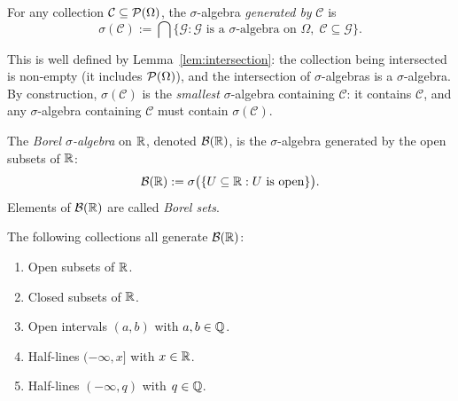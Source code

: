 \documentclass[11pt,a4paper]{article}
\begin{document}
\begin{definition}
\label{def:generated}
For any collection $\mathcal{C} \subseteq \mathcal{P}(\Omega)$, the
$\sigma$-algebra \emph{generated by} $\mathcal{C}$ is
\begin{equation}
  \sigma(\mathcal{C}) := \bigcap\bigl\{\mathcal{G} :
    \mathcal{G} \text{ is a $\sigma$-algebra on } \Omega,\;
    \mathcal{C} \subseteq \mathcal{G}\bigr\}.
  \label{eq:generated}
\end{equation}
\end{definition}

\begin{remark}
This is well defined by Lemma~\ref{lem:intersection}: the collection
being intersected is non-empty (it includes $\mathcal{P}(\Omega)$), and the
intersection of $\sigma$-algebras is a $\sigma$-algebra. By construction,
$\sigma(\mathcal{C})$ is the \emph{smallest} $\sigma$-algebra containing
$\mathcal{C}$: it contains $\mathcal{C}$, and any $\sigma$-algebra
containing $\mathcal{C}$ must contain $\sigma(\mathcal{C})$.
\end{remark}

\begin{definition}
\label{def:borel}
The \emph{Borel $\sigma$-algebra} on $\mathbb{R}$, denoted $\mathcal{B}(\mathbb{R})$, is the
$\sigma$-algebra generated by the open subsets of $\mathbb{R}$:
\begin{equation}
  \mathcal{B}(\mathbb{R}) := \sigma\bigl(\{U \subseteq \mathbb{R} : U \text{ is open}\}\bigr).
  \label{eq:borel}
\end{equation}
Elements of $\mathcal{B}(\mathbb{R})$ are called \emph{Borel sets}.
\end{definition}

\begin{proposition}
\label{prop:borel_generators}
The following collections all generate $\mathcal{B}(\mathbb{R})$:
\begin{enumerate}[nosep,label=(\alph*)]
  \item Open subsets of $\mathbb{R}$.
  \item Closed subsets of $\mathbb{R}$.
  \item Open intervals $(a, b)$ with $a, b \in \mathbb{Q}$.
  \item Half-lines $(-\infty, x]$ with $x \in \mathbb{R}$.
  \item Half-lines $(-\infty, q)$ with $q \in \mathbb{Q}$.
\end{enumerate}
\end{proposition}
\end{document}
